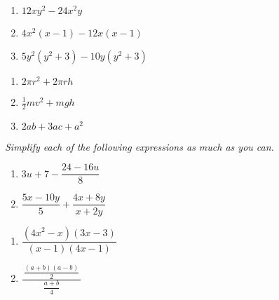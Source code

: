 \documentclass[11pt]{article}
\newcommand{\ds}{\displaystyle}
\begin{document}
\begin{multicols}{3}
\begin{enumerate}
\setcounter{enumi}{\theenumCount}
\item $12xy^2 - 24 x^2 y$ 
\item $4x^2(x-1) - 12x(x-1)$ 
\item $5y^2(y^2+3)-10y(y^2+3)$ 
\setcounter{enumCount}{\theenumi}
\end{enumerate}
\end{multicols}
\vfill

\begin{multicols}{3}
\begin{enumerate}
\setcounter{enumi}{\theenumCount}
\item $2\pi r^2 + 2 \pi r h$ 
\item $\tfrac{1}{2} m v^2 + m g h$ 
\item $2ab + 3ac + a^2$ 
\setcounter{enumCount}{\theenumi}
\end{enumerate}
\end{multicols}
\vfill



\newpage
\noindent
\textit{Simplify each of the following expressions as much as you can. }
\begin{multicols}{2}
\begin{enumerate}
\setcounter{enumi}{\theenumCount}
\item $3u+7 - \dfrac{24-16u}{8}$
\item $\dfrac{5x - 10y}{5} + \dfrac{4x+8y}{x+2y}$ 
\setcounter{enumCount}{\theenumi}
\end{enumerate}
\end{multicols}
\vfill

\begin{multicols}{2}
\begin{enumerate}
\setcounter{enumi}{\theenumCount}
\item $\dfrac{(4x^2-x)(3x-3)}{(x-1)(4x-1)}$
\item $\ds \frac{~\dfrac{(a+b)(a - b)}{2}~}{\dfrac{a+b}{4}}$
\setcounter{enumCount}{\theenumi}
\end{enumerate}
\end{multicols}
\vfill

\end{document}
